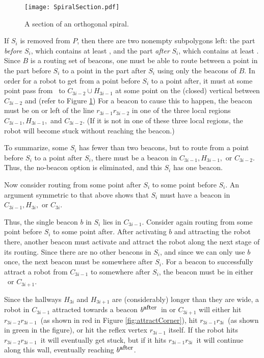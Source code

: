 \documentclass{article}
\begin{document}
\begin{figure}[htb] 
	\begin{center}
		\texttt{[image: SpiralSection.pdf]} 
	\end{center}
	\caption{ A section of an orthogonal spiral. }
	\label{fig:spiralSection}
\end{figure}

If $S_i$ is removed from $P$, then there are two nonempty subpolygons left:
the part \emph{before} $S_i$, which contains at least ,
and the part \emph{after} $S_i$, which contains at least .
Since $B$ is a routing set of beacons, one must be able to route between
a point in the part before $S_i$ to a point in the part after $S_i$ using only
the beacons of $B$.
In order for a robot to get from a point before $S_i$ to a point after,
it must at some point pass from \ to $C_{3i-2} \cup H_{3i-1}$ at some
point on the (closed) vertical between $C_{3i-2}$ and  (refer to
Figure \ref{fig:spiralSection})
 For a beacon to cause this to happen, the beacon must be on or left of the
 line $r_{3i-1}r_{3i-2}$ in one of the three local regions $C_{3i-1}, H_{3i-1},$
 and $C_{3i-2}$. (If it is not in one of these three local regions, the robot 
 will become stuck without reaching the beacon.)

To summarize, some $S_i$ has fewer than two beacons, but to route from a point
before $S_i$ to a point after $S_i$, there must be a beacon in $C_{3i-1}, H_{3i-1},$
 or $C_{3i-2}$.  Thus, the no-beacon option is eliminated, and this $S_i$ has
 one beacon.  
 
Now consider routing from some point after $S_i$ to some point before $S_i$.
An argument symmetric to that above shows that $S_i$ must have a beacon in
$C_{3i-1}, H_{3i},$ or $C_{3i}$.

Thus, the single beacon $b$ in $S_i$ lies in $C_{3i-1}$.
Consider again routing from some point before $S_i$ to some point after.
After activating $b$ and attracting the robot there, another beacon must
activate and attract the robot along the next stage of its routing.
Since there are no other beacons in $S_i$, and since we can only use $b$
once, the next beacon must be somewhere after $S_i$.
For a beacon to successfully attract a robot from $C_{3i-1}$ to somewhere
after $S_i$, the beacon must be in either \ or $C_{3i+1}$. 

\newcommand{\bafter}{\ensuremath{b^{\mbox{\small after}}}}
\newcommand{\ebad}{\ensuremath{r_{3i-2}r_{3i-1}}}
\newcommand{\egood}{\ensuremath{r_{3i-1}r_{3i}}}
Since the hallways $H_{3i}$ and $H_{3i+1}$ are (considerably) longer than they
are wide, a robot in $C_{3i-1}$ attracted towards a beacon \bafter\ in 
or $C_{3i+1}$ will either hit \ebad\  (as shown in red in Figure
\ref{fig:attractCorner}), hit \egood\  (as shown in green in
the figure), or hit the reflex vertex $r_{3i-1}$ itself.
If the robot hits \ebad\  it will eventually get stuck,
but if it hits \egood\  it will continue along this wall,
eventually reaching \bafter.
\end{document}
